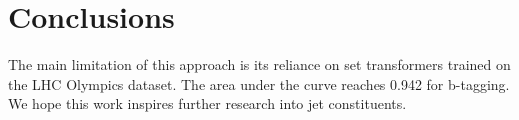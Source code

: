 \section{Conclusions}\label{sec:conclusions}

The main limitation of this approach is its reliance on set transformers
trained on the LHC Olympics dataset. The area under the curve reaches
0.942 for b-tagging. We hope this work inspires further research into
jet constituents.

